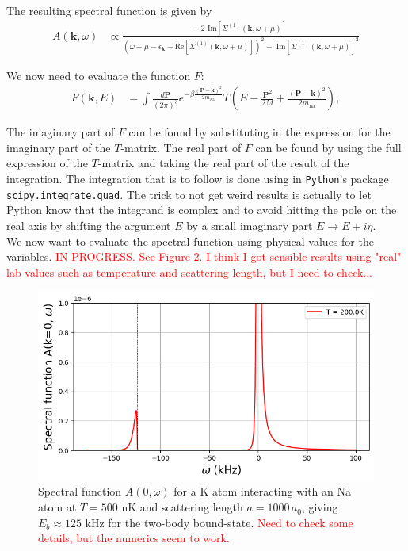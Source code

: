 \documentclass{article}
\theoremstyle{definition}
\begin{document}
\noindent The resulting spectral function is given by 
\begin{align}
A(\mathbf{k}, \omega) 
&\propto
\frac
{-2 \text{ Im}[\Sigma^{(1)}(\mathbf{k}, \omega + \mu)]}
{
(\omega + \mu -\epsilon_\mathbf{k} - \text{Re}[\Sigma^{(1)}(\mathbf{k}, \omega + \mu)])^2 
+
\text{ Im}[\Sigma^{(1)}(\mathbf{k}, \omega + \mu)]^2
}
\end{align}

\noindent We now need to evaluate the function $F$:
\begin{align}
F(\mathbf{k}, E) 
&= \int \frac{d\mathbf{P}}{(2\pi)^3} e^{-\beta \frac{(\mathbf{P} - \mathbf{k})^2}{2m_\text{Na}}} 
T\left( E - \frac{\mathbf{P}^2}{2M} + \frac{(\mathbf{P} - \mathbf{k})^2}{2m_\text{na}} \right),
\end{align}

\noindent The imaginary part of $F$ can be found by substituting in the expression for the imaginary part of the $T$-matrix. The real part of $F$ can be found by using the full expression of the $T$-matrix and taking the real part of the result of the integration. The integration that is to follow is done using in \texttt{Python}'s package \texttt{scipy.integrate.quad}. The trick to not get weird results is actually to let Python know that the integrand is complex and to avoid hitting the pole on the real axis by shifting the argument $E$ by a small imaginary part $E \to E + i\eta$. \\

\noindent We now want to evaluate the spectral function using physical values for the variables. \textcolor{red}{IN PROGRESS. See Figure 2. I think I got sensible results using "real" lab values such as temperature and scattering length, but I need to check...}


\begin{figure}[!htb]
  \centering
  \includegraphics[width=.95\linewidth]{A_bose_fermi_1}
\caption{Spectral function $A(0, \omega)$ for a K atom interacting with an Na atom at $T = 500$ nK and scattering length $a = 1000 \, a_0$, giving $E_b \approx 125$ kHz for the two-body bound-state. \textcolor{red}{Need to check some details, but the numerics seem to work.}}
\label{fig:fermion-spectrum}
\end{figure}
\end{document}
